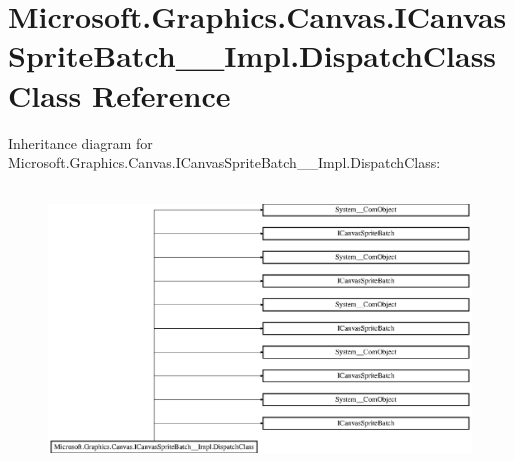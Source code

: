 \hypertarget{class_microsoft_1_1_graphics_1_1_canvas_1_1_i_canvas_sprite_batch_____impl_1_1_dispatch_class}{}\section{Microsoft.\+Graphics.\+Canvas.\+I\+Canvas\+Sprite\+Batch\+\_\+\+\_\+\+Impl.\+Dispatch\+Class Class Reference}
\label{class_microsoft_1_1_graphics_1_1_canvas_1_1_i_canvas_sprite_batch_____impl_1_1_dispatch_class}
Inheritance diagram for Microsoft.\+Graphics.\+Canvas.\+I\+Canvas\+Sprite\+Batch\+\_\+\+\_\+\+Impl.\+Dispatch\+Class\+:\begin{figure}[H]
\begin{center}
\leavevmode
\includegraphics[height=7.512195cm]{class_microsoft_1_1_graphics_1_1_canvas_1_1_i_canvas_sprite_batch_____impl_1_1_dispatch_class}
\end{center}
\end{figure}
